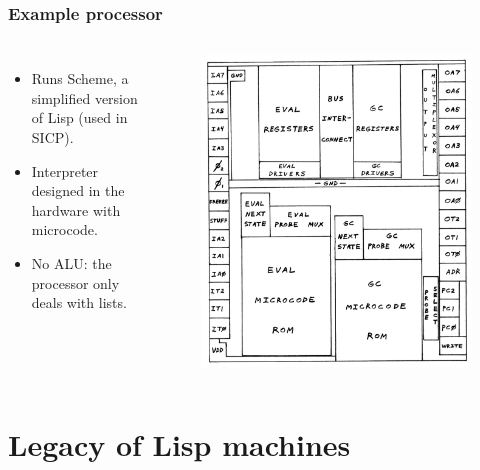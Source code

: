 \documentclass{beamer}
\begin{document}
\begin{frame}
	\frametitle{Example processor}
	\begin{columns}[c] 
			\begin{itemize}
				\item Runs Scheme, a simplified version of Lisp (used in SICP).
				\newline
				\item Interpreter designed in the hardware with microcode.
				\newline
				\item No ALU: the processor only deals with lists.
			\end{itemize}
			\begin{figure}
				\includegraphics[width=1\linewidth]{../img/processor}
			\end{figure}
	\end{columns}
\end{frame}
			

\section{Legacy of Lisp machines}
\end{document}
